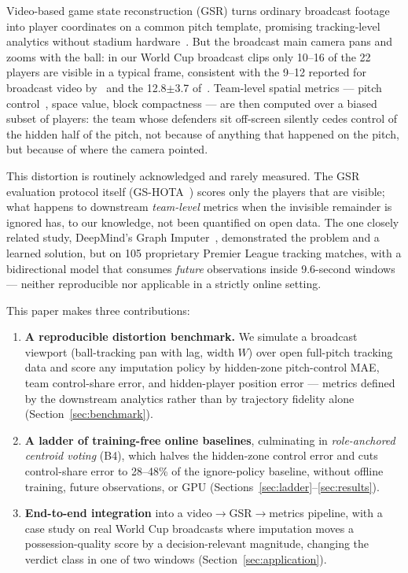 \documentclass[11pt]{article}
\begin{document}
Video-based game state reconstruction (GSR) turns ordinary broadcast footage into
player coordinates on a common pitch template, promising tracking-level analytics
without stadium hardware~\citep{somers2024soccernet}. But the broadcast main
camera pans and zooms with the ball: in our World Cup broadcast clips only
10--16 of the 22 players are visible in a typical frame, consistent with the
9--12 reported for broadcast video by~\citet{ochin2025footpass} and the
12.8$\pm$3.7 of~\citet{omidshafiei2022}.
Team-level spatial metrics --- pitch control~\citep{spearman2017physics,
spearman2018beyond}, space value, block compactness --- are then computed over a
biased subset of players: the team whose defenders sit off-screen silently cedes
control of the hidden half of the pitch, not because of anything that happened on
the pitch, but because of where the camera pointed.

This distortion is routinely acknowledged and rarely measured. The GSR evaluation
protocol itself (GS-HOTA~\citep{somers2024soccernet}) scores only the players
that are visible; what happens to downstream \emph{team-level} metrics when the
invisible remainder is ignored has, to our knowledge, not been quantified on open
data. The one closely related study, DeepMind's Graph
Imputer~\citep{omidshafiei2022}, demonstrated the problem and a learned solution,
but on 105 proprietary Premier League tracking matches, with a bidirectional
model that consumes \emph{future} observations inside 9.6-second windows ---
neither reproducible nor applicable in a strictly online setting.

This paper makes three contributions:

\begin{enumerate}
\item \textbf{A reproducible distortion benchmark.} We simulate a broadcast
viewport (ball-tracking pan with lag, width $W$) over open full-pitch tracking
data and score any imputation policy by hidden-zone pitch-control MAE, team
control-share error, and hidden-player position error --- metrics defined by the
downstream analytics rather than by trajectory fidelity alone
(Section~\ref{sec:benchmark}).
\item \textbf{A ladder of training-free online baselines}, culminating in
\emph{role-anchored centroid voting} (B4), which halves the hidden-zone control
error and cuts control-share error to 28--48\% of the ignore-policy
baseline, without offline training, future observations, or GPU
(Sections~\ref{sec:ladder}--\ref{sec:results}).
\item \textbf{End-to-end integration} into a video$\to$GSR$\to$metrics
pipeline, with a case study on real World Cup broadcasts where imputation
moves a possession-quality score by a decision-relevant magnitude, changing
the verdict class in one of two windows (Section~\ref{sec:application}).
\end{enumerate}
\end{document}
